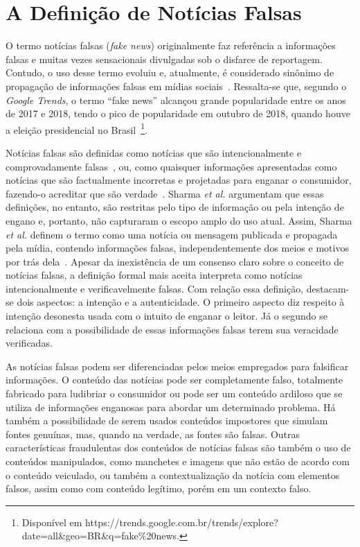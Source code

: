 \documentclass{SBCbookchapter}
\begin{document}
\section{A Definição de Notícias Falsas}
\label{sec:def}

O termo notícias falsas (\textit{fake news}) originalmente faz referência a informações falsas e muitas vezes sensacionais divulgadas sob o disfarce de reportagem. Contudo, o uso desse termo evoluiu e, atualmente, é considerado sinônimo de propagação de informações falsas em mídias sociais~\cite{sharma2019combating}. Ressalta-se que, segundo o \textit{Google Trends}, o termo ``fake news'' alcançou grande popularidade entre os anos de 2017 e 2018, tendo o pico de popularidade em outubro de 2018, quando houve a eleição presidencial no Brasil~\footnote{Disponível em https://trends.google.com.br/trends/explore?date=all\&geo=BR\&q=fake\%20news.}. 

Notícias falsas são definidas como notícias que são intencionalmente e comprovadamente falsas~\cite{zhou2018fake}, ou, como quaisquer informações apresentadas como notícias que são factualmente incorretas e projetadas para enganar o consumidor, fazendo-o acreditar que são verdade~\cite{golbeck2018}. Sharma {\it et al.} argumentam que essas definições, no entanto, são restritas pelo tipo de informação ou pela intenção de engano e, portanto, não capturaram o escopo amplo do uso atual. Assim, Sharma {\it et al.} definem o termo como uma notícia ou mensagem publicada e propagada pela mídia, contendo informações falsas, independentemente dos meios e motivos por trás dela~\cite{sharma2019combating}. Apesar da inexistência de um consenso claro sobre o conceito de notícias falsas, a definição formal mais aceita interpreta como notícias intencionalmente e verificavelmente falsas. Com relação essa definição, destacam-se dois aspectos: a intenção e a autenticidade. O primeiro aspecto diz respeito à intenção desonesta usada com o intuito de enganar o leitor. Já o segundo se relaciona com a possibilidade de essas informações falsas terem sua veracidade verificadas.  

As notícias falsas podem ser diferenciadas pelos meios empregados para falsificar informações. O conteúdo das notícias pode ser completamente falso, totalmente fabricado para ludibriar o consumidor ou pode ser um conteúdo ardiloso que se utiliza de informações enganosas para abordar um determinado problema. Há também a possibilidade de serem usados conteúdos impostores que simulam fontes genuínas, mas, quando na verdade, as fontes são falsas. Outras características fraudulentas dos conteúdos de notícias falsas são também o uso de conteúdos manipulados, como manchetes e imagens que não estão de acordo com o conteúdo veiculado, ou também a contextualização da notícia com elementos falsos, assim como com conteúdo legítimo, porém em um contexto falso.
\end{document}
